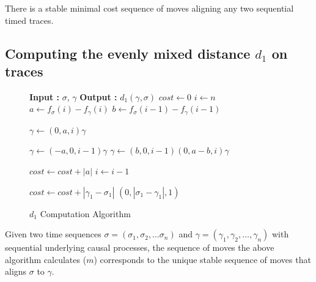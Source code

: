 \documentclass[runningheads]{llncs}
\makeatletter
\newcommand{\removelatexerror}{\let\@latex@error\@gobble}
\makeatother
\begin{document}
	\begin{lemma}\label{stablebest} There is a stable minimal cost sequence of moves aligning any two sequential timed traces. 
	\end{lemma}
	
	
	\subsection{Computing the evenly mixed distance $d_1$ on traces}\label{3}
	
	\begin{figure}[!t]
		\removelatexerror
		\begin{algorithm}[H]
			\caption{$d_1$ Computation Algorithm}
			\label{MixBackwardsAlgo}
			\begin{algorithmic}
				\State \textbf{Input : }  $\sigma$, $\gamma$
				\State \textbf{Output : }  $d_1(\gamma, \sigma)$
				\State $cost \gets 0$
				\State $i \gets n$
				\State $a \gets f_\sigma(i) - f_\gamma(i)$
				\State $b \gets f_\sigma(i-1) - f_\gamma(i-1)$
				
			\State $\gamma \gets (0, a, i) \gamma$
			
		
		\State $\gamma \gets (-a, 0, i-1)\gamma$
		\Else
	\State $\gamma \gets (b, 0, i-1)(0, a-b, i) \gamma$
	\EndIf
	
	\State  $cost \gets cost + |a|$ 
	\State $i \gets i-1$
	\EndWhile
	
	\State $cost \gets cost + |\gamma_1 - \sigma_1|$  \Comment $(0, |\sigma_1- \gamma_1|, 1)$
	
\end{algorithmic}
\end{algorithm}
\end{figure}
\begin{lemma}\label{mixwordalgostable} Given two time sequences $\sigma = (\sigma_1, \sigma_2, \dots \sigma_n)$ and $\gamma = (\gamma_1, \gamma_2, \dots , \gamma_n)$ with sequential underlying causal processes, the sequence of moves the above algorithm calculates ($m$) corresponds to the unique stable sequence of moves that aligns $\sigma$ to $\gamma$. 
\end{lemma}
\end{document}
